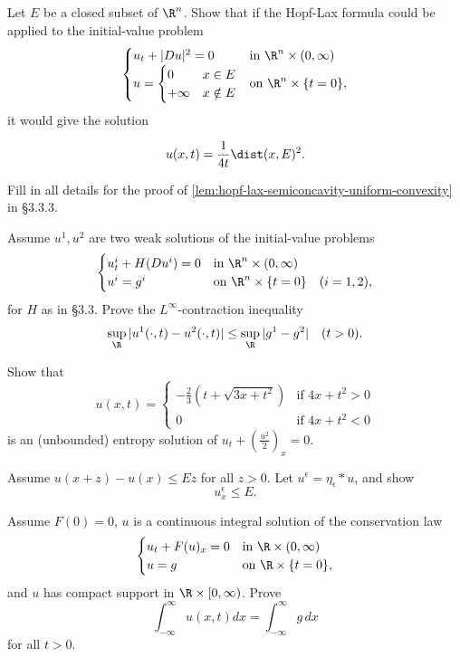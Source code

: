 \begin{exercise}
Let $E$ be a closed subset of $\R^n$. Show that if the Hopf-Lax formula could be applied to the initial-value problem
$$\begin{cases}
u_t + |Du|^2 = 0 & \text{in } \R^n \times (0, \infty) \\
u = \begin{cases} 0 & x \in E \\ +\infty & x \notin E \end{cases} & \text{on } \R^n \times \{t = 0\},
\end{cases}$$
it would give the solution

$$u(x,t) = \frac{1}{4t}\dist(x, E)^2.$$
\end{exercise}

\begin{exercise}
Fill in all details for the proof of \cref{lem:hopf-lax-semiconcavity-uniform-convexity} in \S3.3.3.
\end{exercise}

\begin{exercise}
Assume $u^1, u^2$ are two weak solutions of the initial-value problems
$$
\begin{cases}
u_t^i + H(Du^i) = 0 & \text{in } \R^n \times (0, \infty) \\
u^i = g^i & \text{on } \R^n \times \{t = 0\} \quad (i = 1,2),
\end{cases}
$$
for $H$ as in \S3.3. Prove the $L^\infty$-contraction inequality
$$\sup_{\R} |u^1(\cdot, t) - u^2(\cdot, t)| \leq \sup_{\R} |g^1 - g^2| \quad (t > 0).$$
\end{exercise}

\begin{exercise}
Show that
$$u(x,t) = \begin{cases} -\frac{2}{3}\left(t + \sqrt{3x + t^2}\right) & \text{if } 4x + t^2 > 0 \\ 0 & \text{if } 4x + t^2 < 0 \end{cases}$$
is an (unbounded) entropy solution of $u_t + \left(\frac{u^2}{2}\right)_x = 0$.
\end{exercise}

\begin{exercise}
Assume $u(x+z) - u(x) \leq Ez$ for all $z > 0$. Let $u^\epsilon = \eta_\epsilon * u$, and show
$$u_x^\epsilon \leq E.$$
\end{exercise}

\begin{exercise}
Assume $F(0) = 0$, $u$ is a continuous integral solution of the conservation law
$$
\begin{cases}
u_t + F(u)_x = 0 & \text{in } \R \times (0, \infty) \\
u = g & \text{on } \R \times \{t = 0\},
\end{cases}
$$
and $u$ has compact support in $\R \times [0, \infty)$. Prove
$$\int_{-\infty}^{\infty} u(x,t) dx = \int_{-\infty}^{\infty} g\,dx$$
for all $t > 0$.
\end{exercise}

